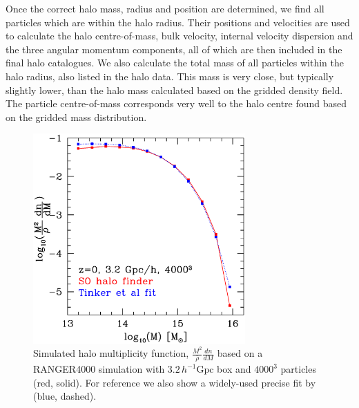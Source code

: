Once the correct halo mass, radius and position are determined, we find all 
particles which are within the halo radius. Their positions and velocities are
used to calculate the halo centre-of-mass, bulk velocity, internal velocity 
dispersion and the three angular momentum components, all of which are then 
included in the final halo catalogues. We also calculate the total mass of
all particles within the halo radius, also listed in the halo data. This mass
is very close, but  typically slightly lower, than the halo mass calculated 
based on the gridded density field. The particle centre-of-mass corresponds 
very well to the halo centre found based on the gridded mass distribution. 


\begin{figure}%
  \begin{center}
    \includegraphics[width=3.2in]{graphs/mf_z0_Tinker.eps}
  \end{center}
  \caption{Simulated halo multiplicity function, 
    $\frac{M^2}{\bar{\rho}}\frac{dn}{dM}$ based on a
    RANGER4000 simulation with $3.2\,h^{-1} \mbox{Gpc}$ box and $4000^3$ 
    particles (red, solid). For reference we also show a widely-used 
    precise fit by \citet{2008ApJ...688..709T} (blue, dashed). 
    \label{mf}}
\end{figure}

